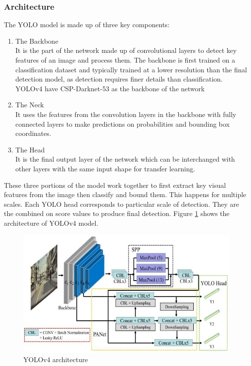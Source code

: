 \subsubsection{Architecture}
The YOLO model is made up of three key components:
\begin{enumerate}
	\item The Backbone \\
	It is the part of the network made up of convolutional layers to detect key features of an image and process them. The backbone is first trained on a classification dataset and typically trained at a lower resolution than the final detection model, as detection requires finer details than classification. YOLOv4 have CSP-Darknet-53 as the backbone of the network 

	\item The Neck \\
	It uses the features from the convolution layers in the backbone with fully connected layers to make predictions on probabilities and bounding box coordinates. 
	
	\item The Head \\
	It is the final output layer of the network which can be interchanged with other layers with the same input shape for transfer learning. 	
\end{enumerate} 
These three portions of the model work together to first extract key visual features from the image then classify and bound them. This happens for multiple scales. Each YOLO head corresponds to particular scale of detection. They are the combined on score values to produce final detection. Figure \ref{fig:yolov4-architecture} shows the architecture of YOLOv4 model.

\begin{figure}[H]
	\centering
	\includegraphics[width=0.85\linewidth]{Images/YOLOV4-research-gate}
	\caption{YOLOv4 architecture}
	\label{fig:yolov4-architecture}
\end{figure}


